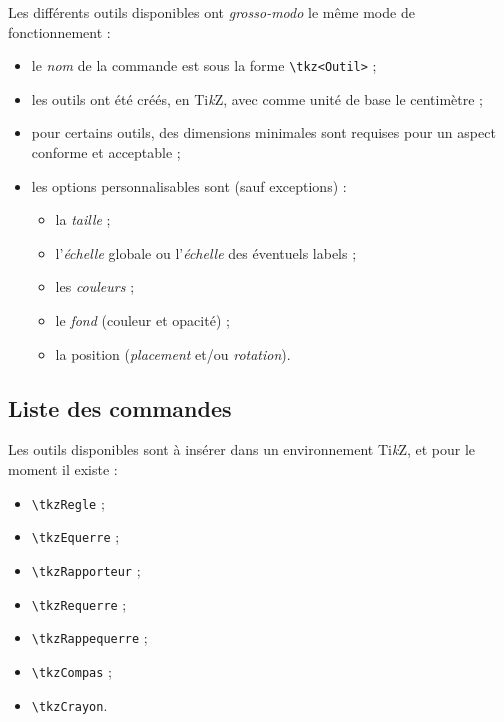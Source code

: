 \documentclass[french,a4paper,11pt]{article}
\providecommand\tikzlogo{Ti\textit{k}Z}
\let\TikZ\tikzlogo
\begin{document}
\begin{tipblock}
Les différents outils disponibles ont \textit{grosso-modo} le même mode de fonctionnement :

\begin{itemize}
	\item le \textit{nom} de la commande est sous la forme \texttt{\textbackslash tkz<Outil>} ;
	\item les outils ont été créés, en \TikZ, avec comme unité de base le centimètre ;
	\item pour certains outils, des dimensions minimales sont requises pour un aspect conforme et acceptable ;
	\item les options personnalisables sont (sauf exceptions) :
	\begin{itemize}
		\item la \textit{taille} ;
		\item l'\textit{échelle} globale ou l'\textit{échelle} des éventuels labels ;
		\item les \textit{couleurs} ;
		\item le \textit{fond} (couleur et opacité) ;
		\item la position (\textit{placement} et/ou \textit{rotation}).
	\end{itemize}
\end{itemize}
\vspace*{-\baselineskip}\leavevmode
\end{tipblock}

\subsection{Liste des commandes}

\begin{cautionblock}
Les outils disponibles sont à insérer dans un environnement \TikZ, et pour le moment il existe :
\begin{itemize}
	\item \texttt{\textbackslash tkzRegle} ;
	\item \texttt{\textbackslash tkzEquerre} ;
	\item \texttt{\textbackslash tkzRapporteur} ;
	\item \texttt{\textbackslash tkzRequerre} ;
	\item \texttt{\textbackslash tkzRappequerre} ;
	\item \texttt{\textbackslash tkzCompas} ;
	\item \texttt{\textbackslash tkzCrayon}.
\end{itemize}
\vspace*{-\baselineskip}\leavevmode
\end{cautionblock}
\end{document}
